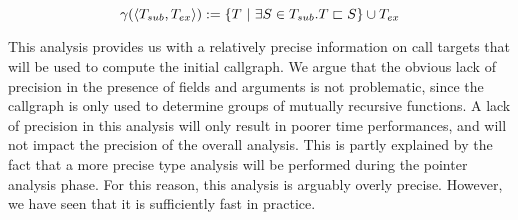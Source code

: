 $$
\gamma(\langle T_{sub}, T_{ex} \rangle ) := \{ T ~|~ \exists S \in T_{sub}. T \sqsubset S\} \cup T_{ex}
$$

This analysis provides us with a relatively precise information on call targets
that will be used to compute the initial callgraph. We argue that the obvious
lack of precision in the presence of fields and arguments is not problematic,
since the callgraph is only used to determine groups of mutually recursive
functions. A lack of precision in this analysis will only result in poorer time
performances, and will not impact the precision of the overall analysis. This
is partly explained by the fact that a more precise type analysis will be
performed during the pointer analysis phase. For this reason, this analysis is
arguably overly precise. However, we have seen that it is sufficiently fast in
practice.
